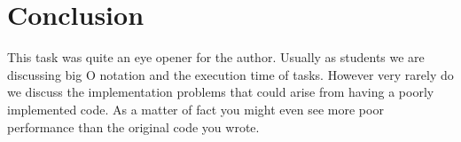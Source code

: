 \documentclass[a4paper,11pt]{article}
\begin{document}
\section*{Conclusion}

This task was quite an eye opener for the author. Usually as students we are discussing big O notation and the execution time of tasks. However very rarely do we discuss the implementation problems that could arise from having a poorly implemented code. As a matter of fact you might even see more poor performance than the original code you wrote.
\end{document}
